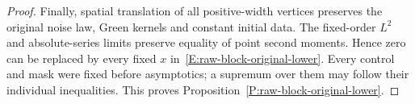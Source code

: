 \begin{proof}
  Finally, spatial translation of all positive-width vertices
  preserves the original noise law, Green kernels and constant
  initial data. The fixed-order $L^2$ and absolute-series limits
  preserve equality of point second moments. Hence zero can be
  replaced by every fixed $x$ in~\eqref{E:raw-block-original-lower}.
  Every control and mask were fixed before asymptotics; a supremum
  over them may follow their individual inequalities.
  This proves Proposition~\ref{P:raw-block-original-lower}.
\end{proof}
